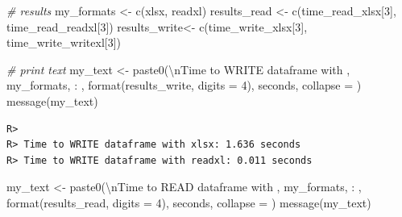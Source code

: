 \documentclass[
  11pt,
]{book}
\newenvironment{Shaded}{\begin{snugshade}}{\end{snugshade}}
\newcommand{\AttributeTok}[1]{\textcolor[rgb]{0.61,0.61,0.61}{#1}}
\newcommand{\CommentTok}[1]{\textcolor[rgb]{0.37,0.37,0.37}{\textit{#1}}}
\newcommand{\DecValTok}[1]{\textcolor[rgb]{0.06,0.06,0.06}{#1}}
\newcommand{\FunctionTok}[1]{\textcolor[rgb]{0,0,0}{#1}}
\newcommand{\NormalTok}[1]{#1}
\newcommand{\OtherTok}[1]{\textcolor[rgb]{0.37,0.37,0.37}{#1}}
\newcommand{\SpecialCharTok}[1]{\textcolor[rgb]{0,0,0}{#1}}
\newcommand{\StringTok}[1]{\textcolor[rgb]{0.5,0.5,0.5}{#1}}
\begin{document}
\begin{Shaded}
\begin{Highlighting}[]
\CommentTok{\# results}
\NormalTok{my\_formats }\OtherTok{\textless{}{-}} \FunctionTok{c}\NormalTok{(}\StringTok{\textquotesingle{}xlsx\textquotesingle{}}\NormalTok{, }\StringTok{\textquotesingle{}readxl\textquotesingle{}}\NormalTok{)}
\NormalTok{results\_read }\OtherTok{\textless{}{-}} \FunctionTok{c}\NormalTok{(time\_read\_xlsx[}\DecValTok{3}\NormalTok{], time\_read\_readxl[}\DecValTok{3}\NormalTok{])}
\NormalTok{results\_write}\OtherTok{\textless{}{-}} \FunctionTok{c}\NormalTok{(time\_write\_xlsx[}\DecValTok{3}\NormalTok{], time\_write\_writexl[}\DecValTok{3}\NormalTok{])}

\CommentTok{\# print text}
\NormalTok{my\_text }\OtherTok{\textless{}{-}} \FunctionTok{paste0}\NormalTok{(}\StringTok{\textquotesingle{}}\SpecialCharTok{\textbackslash{}n}\StringTok{Time to WRITE dataframe with \textquotesingle{}}\NormalTok{,}
\NormalTok{                  my\_formats, }\StringTok{\textquotesingle{}: \textquotesingle{}}\NormalTok{,}
                  \FunctionTok{format}\NormalTok{(results\_write, }\AttributeTok{digits =} \DecValTok{4}\NormalTok{),}
                  \StringTok{\textquotesingle{} seconds\textquotesingle{}}\NormalTok{, }\AttributeTok{collapse =} \StringTok{\textquotesingle{}\textquotesingle{}}\NormalTok{)}
\FunctionTok{message}\NormalTok{(my\_text)}
\end{Highlighting}
\end{Shaded}

\begin{verbatim}
R> 
R> Time to WRITE dataframe with xlsx: 1.636 seconds
R> Time to WRITE dataframe with readxl: 0.011 seconds
\end{verbatim}

\begin{Shaded}
\begin{Highlighting}[]
\NormalTok{my\_text }\OtherTok{\textless{}{-}} \FunctionTok{paste0}\NormalTok{(}\StringTok{\textquotesingle{}}\SpecialCharTok{\textbackslash{}n}\StringTok{Time to READ dataframe with \textquotesingle{}}\NormalTok{,}
\NormalTok{                  my\_formats, }\StringTok{\textquotesingle{}: \textquotesingle{}}\NormalTok{,}
                  \FunctionTok{format}\NormalTok{(results\_read, }\AttributeTok{digits =} \DecValTok{4}\NormalTok{),}
                  \StringTok{\textquotesingle{} seconds\textquotesingle{}}\NormalTok{, }\AttributeTok{collapse =} \StringTok{\textquotesingle{}\textquotesingle{}}\NormalTok{)}
\FunctionTok{message}\NormalTok{(my\_text)}
\end{Highlighting}
\end{Shaded}
\end{document}
